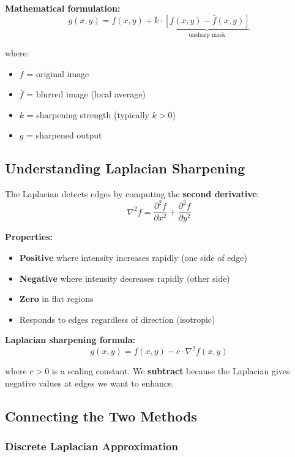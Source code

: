 \documentclass[12pt,a4paper]{article}
\begin{document}
\textbf{Mathematical formulation:}
\[
\boxed{g(x,y) = f(x,y) + k \cdot \underbrace{[f(x,y) - \bar{f}(x,y)]}_{\text{unsharp mask}}}
\]

where:
\begin{itemize}
    \item $f$ = original image
    \item $\bar{f}$ = blurred image (local average)
    \item $k$ = sharpening strength (typically $k > 0$)
    \item $g$ = sharpened output
\end{itemize}

\subsection{Understanding Laplacian Sharpening}

\begin{conceptbox}
The Laplacian detects edges by computing the \textbf{second derivative}:
\[
\nabla^2 f = \frac{\partial^2 f}{\partial x^2} + \frac{\partial^2 f}{\partial y^2}
\]

\textbf{Properties:}
\begin{itemize}
    \item \textbf{Positive} where intensity increases rapidly (one side of edge)
    \item \textbf{Negative} where intensity decreases rapidly (other side)
    \item \textbf{Zero} in flat regions
    \item Responds to edges regardless of direction (isotropic)
\end{itemize}
\end{conceptbox}

\textbf{Laplacian sharpening formula:}
\[
\boxed{g(x,y) = f(x,y) - c \cdot \nabla^2 f(x,y)}
\]

where $c > 0$ is a scaling constant. We \textbf{subtract} because the Laplacian gives negative values at edges we want to enhance.

\subsection{Connecting the Two Methods}

\subsubsection{Discrete Laplacian Approximation}
\end{document}
